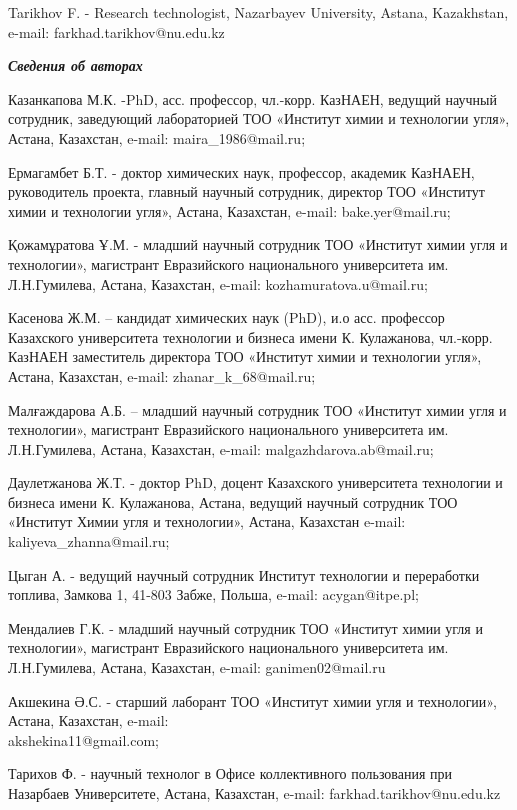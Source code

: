 \begin{authorinfo}
Tarikhov F. - Research technologist, Nazarbayev University, Astana,
Kazakhstan, e-mail: farkhad.tarikhov@nu.edu.kz

\emph{{\bfseries Сведения об авторах}}

Казанкапова М.К. -PhD, асс. профессор, чл.-корр. КазНАЕН,
ведущий научный сотрудник, заведующий лабораторией ТОО «Институт химии и
технологии угля», Астана, Казахстан, e-mail: maira\_1986@mail.ru;

Ермагамбет Б.Т. - доктор химических наук, профессор, академик КазНАЕН,
руководитель проекта, главный научный сотрудник, директор ТОО «Институт
химии и технологии угля», Астана, Казахстан,  e-mail: bake.yer@mail.ru;

Қожамұратова Ұ.М. - младший научный сотрудник ТОО «Институт химии угля и
технологии», магистрант Евразийского национального университета им.
Л.Н.Гумилева, Астана, Казахстан, e-mail: kozhamuratova.u@mail.ru;

Касенова Ж.М. -- кандидат химических наук (PhD), и.о асс. профессор
Казахского университета технологии и бизнеса имени К. Кулажанова,
чл.-корр. КазНАЕН заместитель директора ТОО «Институт химии и технологии
угля», Астана, Казахстан, e-mail: zhanar\_k\_68@mail.ru;

Малғаждарова А.Б. -- младший научный сотрудник ТОО «Институт химии угля
и технологии», магистрант Евразийского национального университета им.
Л.Н.Гумилева, Астана, Казахстан, e-mail: malgazhdarova.ab@mail.ru;

Даулетжанова Ж.Т. - доктор PhD, доцент Казахского университета
технологии и бизнеса имени К. Кулажанова, Астана, ведущий научный
сотрудник ТОО «Институт Химии угля и технологии», Астана, Казахстан
e-mail: \\kaliyeva\_zhanna@mail.ru;

Цыган А. - ведущий научный сотрудник Институт технологии и переработки
топлива, Замкова 1, 41-803 Забже, Польша, e-mail: acygan@itpe.pl;

Мендалиев Г.К. - младший научный сотрудник ТОО «Институт химии угля и
технологии», магистрант Евразийского национального университета им.
Л.Н.Гумилева, Астана, Казахстан, e-mail: ganimen02@mail.ru

Акшекина Ә.С. -  старший лаборант ТОО «Институт химии угля и
технологии», Астана, Казахстан, e-mail: \\akshekina11@gmail.com;

Тарихов Ф. - научный технолог в Офисе коллективного пользования при
Назарбаев Университете, Астана, Казахстан, e-mail: farkhad.tarikhov@nu.edu.kz
\end{authorinfo}
